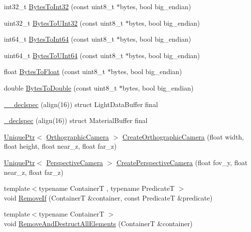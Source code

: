 \begin{DoxyCompactItemize}
\item 
int32\+\_\+t \hyperlink{namespacemage_a274862b36cabc10b90dd7148d42a29a6}{Bytes\+To\+Int32} (const uint8\+\_\+t $\ast$bytes, bool big\+\_\+endian)
\item 
uint32\+\_\+t \hyperlink{namespacemage_a46a019c7f927a6f559b36a8b5c01ab9c}{Bytes\+To\+U\+Int32} (const uint8\+\_\+t $\ast$bytes, bool big\+\_\+endian)
\item 
int64\+\_\+t \hyperlink{namespacemage_a09884643d0e3afe8591f9104785ce480}{Bytes\+To\+Int64} (const uint8\+\_\+t $\ast$bytes, bool big\+\_\+endian)
\item 
uint64\+\_\+t \hyperlink{namespacemage_a93f1f8baabf199005ea96e0a2b6941e3}{Bytes\+To\+U\+Int64} (const uint8\+\_\+t $\ast$bytes, bool big\+\_\+endian)
\item 
float \hyperlink{namespacemage_a5e41913a3a1613add8511e5834e09277}{Bytes\+To\+Float} (const uint8\+\_\+t $\ast$bytes, bool big\+\_\+endian)
\item 
double \hyperlink{namespacemage_af85b8ba1e336f37fc8fe34a53e981a6c}{Bytes\+To\+Double} (const uint8\+\_\+t $\ast$bytes, bool big\+\_\+endian)
\item 
\hyperlink{namespacemage_acb52a2b7136d871548446f56ecb1b36c}{\+\_\+\+\_\+declspec} (align(16)) struct Light\+Data\+Buffer final
\item 
\hyperlink{namespacemage_a76dac28d69746bdef408a08c36a7c862}{\+\_\+declspec} (align(16)) struct Material\+Buffer final
\item 
\hyperlink{namespacemage_a8c307fbcc33bce9b7f2aa4c26c3b95cf}{Unique\+Ptr}$<$ \hyperlink{classmage_1_1_orthographic_camera}{Orthographic\+Camera} $>$ \hyperlink{namespacemage_af3a13511493f2a1278a75a753bee6ae1}{Create\+Orthographic\+Camera} (float width, float height, float near\+\_\+z, float far\+\_\+z)
\item 
\hyperlink{namespacemage_a8c307fbcc33bce9b7f2aa4c26c3b95cf}{Unique\+Ptr}$<$ \hyperlink{classmage_1_1_perspective_camera}{Perspective\+Camera} $>$ \hyperlink{namespacemage_ae3680c3b41fa7f4ff74fc56ebd5da1c5}{Create\+Perspective\+Camera} (float fov\+\_\+y, float near\+\_\+z, float far\+\_\+z)
\item 
{\footnotesize template$<$typename ContainerT , typename PredicateT $>$ }\\void \hyperlink{namespacemage_a403ff95eb779de1fbbf139661feb2d1b}{Remove\+If} (ContainerT \&container, const PredicateT \&predicate)
\item 
{\footnotesize template$<$typename ContainerT $>$ }\\void \hyperlink{namespacemage_a56c8c38aee820faf885024ed22e70a8e}{Remove\+And\+Destruct\+All\+Elements} (ContainerT \&container)

\end{DoxyCompactItemize}
